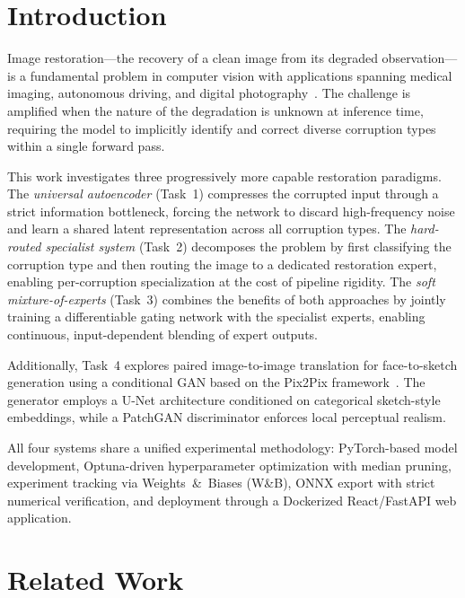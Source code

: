 \documentclass[conference]{IEEEtran}
\begin{document}
\section{Introduction}
\label{sec:introduction}

Image restoration---the recovery of a clean image from its degraded observation---is a fundamental problem in computer vision with applications spanning medical imaging, autonomous driving, and digital photography~\cite{zhang2017beyond}. The challenge is amplified when the nature of the degradation is unknown at inference time, requiring the model to implicitly identify and correct diverse corruption types within a single forward pass.

This work investigates three progressively more capable restoration paradigms. The \textit{universal autoencoder} (Task~1) compresses the corrupted input through a strict information bottleneck, forcing the network to discard high-frequency noise and learn a shared latent representation across all corruption types. The \textit{hard-routed specialist system} (Task~2) decomposes the problem by first classifying the corruption type and then routing the image to a dedicated restoration expert, enabling per-corruption specialization at the cost of pipeline rigidity. The \textit{soft mixture-of-experts} (Task~3) combines the benefits of both approaches by jointly training a differentiable gating network with the specialist experts, enabling continuous, input-dependent blending of expert outputs.

Additionally, Task~4 explores paired image-to-image translation for face-to-sketch generation using a conditional GAN based on the Pix2Pix framework~\cite{isola2017image}. The generator employs a U-Net architecture conditioned on categorical sketch-style embeddings, while a PatchGAN discriminator enforces local perceptual realism.

All four systems share a unified experimental methodology: PyTorch-based model development, Optuna-driven hyperparameter optimization with median pruning, experiment tracking via Weights~\&~Biases (W\&B), ONNX export with strict numerical verification, and deployment through a Dockerized React/FastAPI web application.

\section{Related Work}
\label{sec:related}
\end{document}

